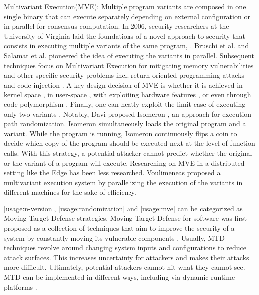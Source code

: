 \begin{usage}{Multivariant Execution(MVE):}
    \label{usage:mve}
    \normalfont
    Multiple program variants are composed in one single binary that can execute separately depending on external configuration or in parallel for consensus computation. In 2006, security researchers at the University of Virginia laid the foundations of a novel approach to security that consists in executing multiple variants of the same program, \cite{cox06}. Bruschi et al. \cite{bruschi2007diversified} and Salamat et al. \cite{salamat2007stopping} pioneered the idea of executing the variants in parallel. Subsequent techniques focus on Multivariant Execution for mitigating memory vulnerabilities \cite{lu2018stopping} and other specific security problems incl. return-oriented programming attacks \cite{volckaert2015cloning} and code injection \cite{SalamatJWWF11}. A key design decision of MVE is whether it is achieved in kernel space \cite{osterlund2019kmvx}, in user-space \cite{salamat2009orchestra}, with exploiting hardware features \cite{koning2016secure}, or even through code polymorphism \cite{10.1145/3281662}. Finally, one can neatly exploit the limit case of executing only two variants \cite{maurer2012tachyon,Kim2015}. Notably,  Davi \etal proposed Isomeron \cite{davi2015isomeron}, an approach  for execution-path randomization. Isomeron simultaneously loads the original program and a variant. While the program is running, Isomeron continuously flips a coin to decide which copy of the program should be executed next at the level of function calls. With this strategy, a potential attacker cannot predict whether the original or the variant of a program will execute.
    Researching on MVE in a distributed setting like the Edge \citationneeded has been less researched. Voulimeneas \etal proposed a multivariant execution system by parallelizing the execution of the variants in different machines \cite{voulimeneas2021dmvx} for the sake of efficiency. 
    
\end{usage}


\autoref{usage:n-version}, \autoref{usage:randomization} and \autoref{usage:mve} can be categorized as Moving Target Defense strategies. Moving Target Defense for software was first proposed as a collection of techniques that aim to improve the security of a system by constantly moving its vulnerable components \cite{MTDNationalCyberLaep, okhravi2013survey}. Usually, MTD techniques revolve around changing system inputs and configurations to reduce attack surfaces. 
This increases uncertainty for attackers and makes their attacks more difficult. Ultimately, potential attackers cannot hit what they cannot see. 
MTD can be implemented in different ways, including via dynamic runtime platforms \cite{10.1145/3318216.3363338}. 
 
